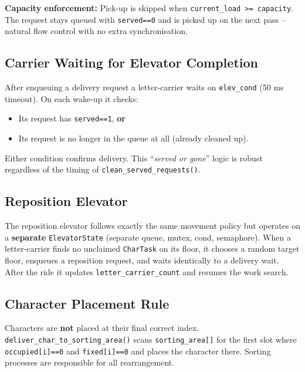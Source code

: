 \documentclass[12pt,a4paper]{article}
\newcommand{\code}[1]{\texttt{\small #1}}
\begin{document}
\begin{notebox}
\textbf{Capacity enforcement:} Pick-up is skipped when
\code{current\_load >= capacity}. The request stays queued with \code{served==0}
and is picked up on the next pass -- natural flow control with no extra
synchronisation.
\end{notebox}

\subsection{Carrier Waiting for Elevator Completion}

After enqueuing a delivery request a letter-carrier waits on \code{elev\_cond}
(50 ms timeout). On each wake-up it checks:

\begin{itemize}
  \item Its request has \code{served==1}, \textbf{or}
  \item Its request is no longer in the queue at all (already cleaned up).
\end{itemize}

Either condition confirms delivery. This ``\emph{served or gone}'' logic is robust
regardless of the timing of \code{clean\_served\_requests()}.

\subsection{Reposition Elevator}

The reposition elevator follows exactly the same movement policy but operates on a
\textbf{separate} \code{ElevatorState} (separate queue, mutex, cond, semaphore).
When a letter-carrier finds no unclaimed \code{CharTask} on its floor, it chooses
a random target floor, enqueues a reposition request, and waits identically to a
delivery wait. After the ride it updates \code{letter\_carrier\_count} and resumes
the work search.

\subsection{Character Placement Rule}

Characters are \textbf{not} placed at their final correct index.
\code{deliver\_char\_to\_sorting\_area()} scans \code{sorting\_area[]} for the first
slot where \code{occupied[i]==0} and \code{fixed[i]==0} and places the character
there. Sorting processes are responsible for all rearrangement.
\end{document}

